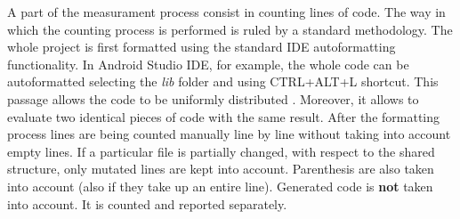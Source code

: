 A part of the measurament process consist in counting lines of code. The way in which the counting process is performed is ruled by a standard methodology. The whole project is first formatted using the standard IDE autoformatting functionality. In Android Studio IDE, for example, the whole code can be autoformatted selecting the \textit{lib }folder and using CTRL+ALT+L shortcut. This passage allows the code to be uniformly distributed . Moreover, it allows to evaluate two identical pieces of code with the same result. After the formatting process lines are being counted manually line by line without taking into account empty lines. If a particular file is partially changed, with respect to the shared structure, only mutated lines are kept into account. Parenthesis are also taken into account (also if they take up an entire line). Generated code is \textbf{not} taken into account. It is counted and reported separately.